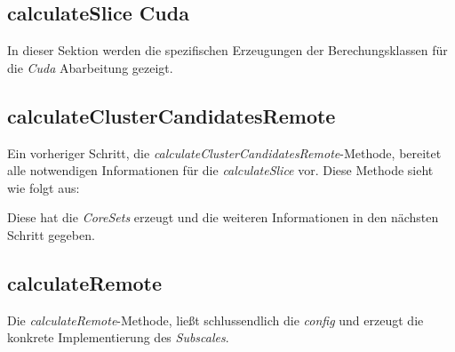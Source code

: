 

\subsection{calculateSlice Cuda}
In dieser Sektion werden die spezifischen Erzeugungen der Berechungsklassen für die \emph{Cuda} Abarbeitung gezeigt.



\subsection{calculateClusterCandidatesRemote}
Ein vorheriger Schritt, die \emph{calculateClusterCandidatesRemote}-Methode, bereitet alle notwendigen
Informationen für die \emph{calculateSlice} vor. Diese Methode sieht wie folgt aus:



Diese hat die \emph{CoreSets} erzeugt und die weiteren Informationen in den nächsten Schritt gegeben.

\subsection{calculateRemote}
Die \emph{calculateRemote}-Methode, ließt schlussendlich die \emph{config} und erzeugt die konkrete Implementierung
des \emph{Subscales}.


